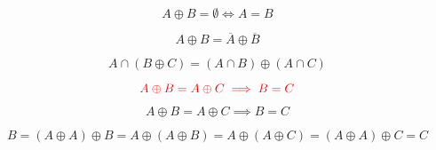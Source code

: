 \begin{frame}{}
  \[
    A \oplus B = \emptyset \iff A = B
  \]

  \[
    A \oplus B = \overline{A} \oplus \overline{B}
  \]

  \[
    A \cap (B \oplus C) = (A \cap B) \oplus (A \cap C)
  \]


  \[
    \textcolor{red}{A \oplus B = A \oplus C \implies B = C}
  \]
\end{frame}

\begin{frame}{}
  \[
    A \oplus B = A \oplus C \implies B = C
  \]

  \pause
  \[
    B = (A \oplus A) \oplus B = A \oplus (A \oplus B)
      = A \oplus (A \oplus C) = (A \oplus A) \oplus C = C
  \]
\end{frame}
